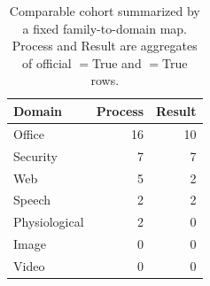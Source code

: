\begin{table}[t]
\caption{Comparable cohort summarized by a fixed family-to-domain map. Process and Result are aggregates of official \processmetric$=$True and \resultmetric$=$True rows.}
\label{tab:domain-summary}
\centering
\small
\begin{tabular}{lrr}
\toprule
\rowcolor{cyan!12}
Domain & Process & Result \\
\midrule
\rowcolors{2}{cyan!4}{white}
Office & 16 & 10 \\
Security & 7 & 7 \\
Web & 5 & 2 \\
Speech & 2 & 2 \\
Physiological & 2 & 0 \\
Image & 0 & 0 \\
Video & 0 & 0 \\
\bottomrule
\end{tabular}
\end{table}

